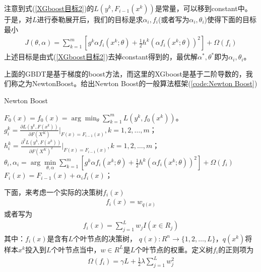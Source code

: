           \par
          注意到式(\ref{XGboost目标2})的$L(y^k,F_{i-1}(x^k))$是常量，可以移到constant中。于是，对$L$进行泰勒展开后，我们的目标是求$\alpha_i,f_i$(或者写为$\alpha_i,\theta_i$)使得下面的目标最小
          \begin{align}
          \label{XGboost目标3}
          J(\theta,\alpha) = \sum_{k=1}^m \left[g^k\alpha f_i(x^k;\theta)+\frac{1}{2}h^k(\alpha f_i(x^k;\theta))^2 \right]+\Omega(f_i)
          \end{align}
          上述目标是由式(\ref{XGboost目标2})去掉constant得到的，最优解$\alpha^*,\theta^*$即为$\alpha_i,\theta_i$。
          \par
          上面的GBDT是基于梯度的boost方法，而这里的XGboost是基于二阶导数的，我们称之为NewtonBoost。给出Newton Boost的一般算法框架(\ref{code:Newton Boost})
              \begin{algorithm}[H]
                  \caption{Newton Boost}\label{code:Newton Boost}
                  \begin{algorithmic}[1]
                      \State $F_0(x) = f_0(x) = \arg\min_\theta \sum_{k=1}^m L(y^k,f_0(x^k))$。
                          \State $g_i^k =\frac{\partial L(y^k, F(x^k))}{\partial F(X^K)}\Big|_{F(x) = F_{i-1}(x)} ,k=1,2,\dots,m$；
                          \State $h_i^k =\frac{\partial^2 L(y^k, F(x^k))}{\partial F(X^K)^2}\Big|_{F(x) = F_{i-1}(x)} ,k=1,2,\dots,m$；
                          \State $\theta_i,\alpha_i = \arg\min\limits_{\theta,\alpha}\sum\limits_{k=1}^m \left[g^k\alpha f_i(x^k;\theta)+\frac{1}{2}h^k(\alpha f_i(x^k;\theta))^2 \right]+\Omega(f_i)$
                          \State $F_i(x) = F_{i-1}(x) + \alpha_if_i(x)$；
                      \EndFor
                  \end{algorithmic}
              \end{algorithm}
          \par
          下面，来考虑一个实际的决策树$f_i(x)$
          \begin{align*}
          f_i(x) = w_{q(x)}
          \end{align*}
          或者写为
          \begin{align*}
          f_i(x) = \sum_{j=1}^L w_j I(x\in R_j)
          \end{align*}
          其中：$f_i(x)$是含有$L$个叶节点的决策树， $q(x):R^n \to \{1,2,\dots,L\}$，$q(x^k)$将样本$x^k$投入到$L$个叶节点当中，$w\in R^L$是$L$个叶节点的权重。定义树$f_i$的正则项为
          \begin{align*}
          \Omega(f_i) = \gamma L+\frac{1}{2}\lambda \sum_{j=1}^L w_j^2
          \end{align*}
